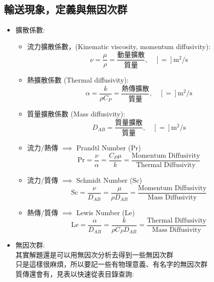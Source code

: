 \documentclass[../main.tex]{subfiles}
\begin{document}
\subsection{輸送現象，定義與無因次群}
\begin{itemize}
\item 擴散係數:
\begin{itemize}
  \item 流力擴散係數，(Kinematic viscosity, momentum diffusivity):
  \begin{equation}
    \nu = \frac{\mu}{\rho} = \frac{\text{動量擴散}}{\text{質量}},\quad [=] \mathrm{m^2/s}
  \end{equation}
  \item 熱擴散係數 (Thermal diffusivity):
  \begin{equation}
    \alpha = \frac{k}{\rho C_P} = \frac{\text{熱傳擴散}}{\text{質量}},\quad [=] \mathrm{m^2/s}
  \end{equation}
  \item 質量擴散係數 (Mass diffusivity):
  \begin{equation}
    D_{AB} = \frac{\text{質量擴散}}{\text{質量}} ,\quad [=] \mathrm{m^2/s}
  \end{equation}
  \item 流力/熱傳 $\implies$ Prandtl Number (Pr)
  \begin{equation}
    \text{Pr} = \frac{\nu}{\alpha} = \frac{C_P \mu}{k} = \frac{\text{Momentum Diffusivity}}{\text{Thermal Diffusivity}}
  \end{equation}
  \item 流力/質傳 $\implies$ Schmidt Number (Sc)
  \begin{equation}
    \text{Sc} = \frac{\nu}{D_{AB}} = \frac{\mu}{\rho D_{AB}} = \frac{\text{Momentum Diffusivity}}{\text{Mass Diffusivity}}
  \end{equation}
  \item 熱傳/質傳 $\implies$ Lewis Number (Le)
  \begin{equation}
    \text{Le} = \frac{\alpha}{D_{AB}} = \frac{k}{\rho C_P D_{AB}} = \frac{\text{Thermal Diffusivity}}{\text{Mass Diffusivity}}
  \end{equation}
\end{itemize}
\item 無因次群:\\
其實解題還是可以用無因次分析去得到一些無因次群\\
只是這樣很麻煩，所以要記一些有物理意義、有名字的無因次群\\
質傳還會有，見表以快速從表目錄查詢:\\

\end{itemize}
\end{document}
